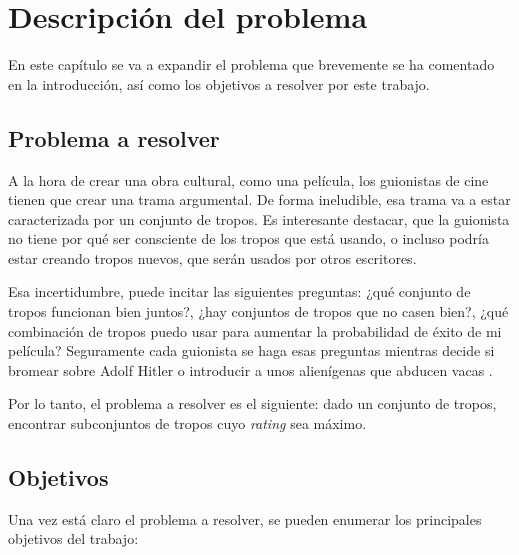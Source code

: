\chapter{Descripción del problema}

En este capítulo se va a expandir el problema que brevemente se ha comentado en
la introducción, así como los objetivos a resolver por este trabajo.

\section{Problema a resolver}

A la hora de crear una obra cultural, como una película, los guionistas de cine
tienen que crear una trama argumental. De forma ineludible, esa trama va a
estar caracterizada por un conjunto de tropos. Es interesante destacar, que la
guionista no tiene por qué ser consciente de los tropos que está usando, o incluso podría estar creando tropos nuevos, que serán usados por otros
escritores.

Esa incertidumbre, puede incitar las siguientes preguntas: ¿qué conjunto de
tropos funcionan bien juntos?, ¿hay conjuntos de tropos que no casen bien?,
¿qué combinación de tropos puedo usar para aumentar la probabilidad de éxito de
mi película? Seguramente cada guionista se haga esas preguntas mientras decide
si bromear sobre Adolf Hitler \cite{tropo:AdolfHitlarious} o introducir a unos
alienígenas que abducen vacas \cite{tropo:AliensStealCattle}.

Por lo tanto, el problema a resolver es el siguiente: dado un conjunto de
tropos, encontrar subconjuntos de tropos cuyo \emph{rating} sea máximo.

\section{Objetivos} \label{section:goals}

Una vez está claro el problema a resolver, se pueden enumerar los principales
objetivos del trabajo:


